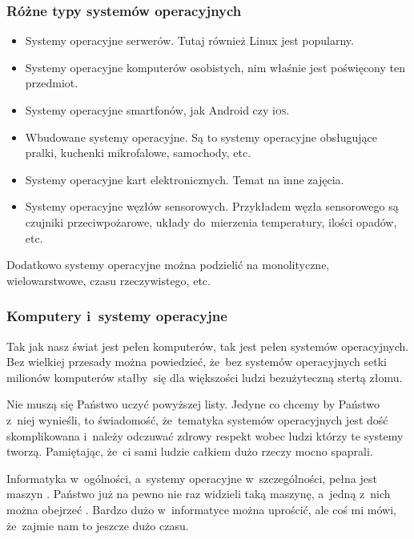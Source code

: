 \documentclass[10pt,t]{beamer}
\begin{document}
\begin{frame}
  \frametitle{Różne typy systemów operacyjnych}


  \begin{itemize}

  \item Systemy operacyjne serwerów. Tutaj również Linux jest popularny.

  \item Systemy operacyjne komputerów osobistych, nim właśnie jest
    poświęcony ten przedmiot.

  \item Systemy operacyjne smartfonów, jak Android czy i\textsc{os}.

  \item Wbudowane systemy operacyjne. Są to systemy operacyjne obsługujące
    pralki, kuchenki mikrofalowe, samochody, etc.

  \item Systemy operacyjne kart elektronicznych. Temat na inne zajęcia.

  \item Systemy operacyjne węzłów sensorowych. Przykładem węzła sensorowego
    są czujniki przeciwpożarowe, układy do~mierzenia temperatury, ilości
    opadów, etc.

  \end{itemize}

  Dodatkowo systemy operacyjne można podzielić na monolityczne,
  wielowarstwowe, czasu rzeczywistego, etc.

\end{frame}





\begin{frame}
  \frametitle{Komputery i~systemy operacyjne}


  Tak jak nasz świat jest pełen komputerów, tak jest pełen systemów
  operacyjnych. Bez wielkiej przesady można powiedzieć, że~bez systemów
  operacyjnych setki milionów komputerów stałby~się dla większości ludzi
  bezużyteczną stertą złomu.

  \alert{Nie} muszą się Państwo uczyć powyższej listy. Jedyne co chcemy by
  Państwo z~niej wynieśli, to świadomość, że~tematyka systemów operacyjnych
  jest dość skomplikowana i~należy odczuwać zdrowy respekt wobec
  ludzi którzy te systemy tworzą. Pamiętając, że~ci sami ludzie
  całkiem dużo rzeczy mocno spaprali.

  Informatyka w~ogólności, a~systemy operacyjne w~szczególności, pełna jest
  maszyn
  . Państwo już na pewno nie raz
  widzieli taką maszynę, a~jedną z~nich można obejrzeć
  .
  Bardzo dużo w~informatyce można uprościć, ale coś mi mówi, że~zajmie nam
  to jeszcze dużo czasu.

\end{frame}
\end{document}
